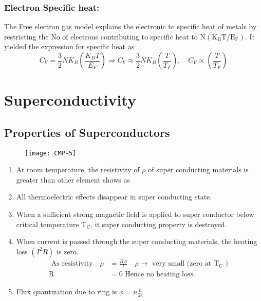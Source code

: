 \subsubsection{Electron Specific heat:}
The Free electron gas model explains the electronic to specific heat of metals by restricting the No of electrons contributing to specific heat to $\mathrm{N}\left(\mathrm{K}_{\mathrm{B}} \mathrm{T} / \mathrm{E}_{\mathrm{F}}\right)$. It yielded the expression for specific heat as
$$C_{V}=\frac{3}{2} N K_{B}\left(\frac{K_{B} T}{E_{F}}\right) \Rightarrow C_{V} \approx \frac{3}{2} N K_{B}\left(\frac{T}{T_{F}}\right), \quad C_{V} \propto\left(\frac{T}{T_{F}}\right)$$
\section{Superconductivity}
\subsection{Properties of Superconductors}
\begin{figure}[H]
	\centering
	\texttt{[image: CMP-5]}
	\caption{}
	\label{}
\end{figure}
\begin{enumerate}
	\item At room temperature, the resistivity of $\rho$ of super conducting materials is greater than other element shows as
	\item All thermoelectric effects disappear in super conducting state.
	\item  When a sufficient strong magnetic field is applied to super conductor below critical temperature $\mathrm{T}_{\mathrm{C}}$, it super conducting property is destroyed.
	\item When current is passed through the super conducting materials, the heating loss $\left(I^{2} R\right)$ is zero.
	\begin{align*}
		\text{	As resistivity}\quad \rho&=\frac{R A}{l} \quad \rho \rightarrow \text { very small (zero at } \mathrm{T}_{\mathrm{C}} \text { ) }\\
		\mathrm{R}&=0 \text { Hence no heating loss. }
	\end{align*}
	\item Flux quantization due to ring is $\phi=n \frac{h}{2 e}$
\end{enumerate}
